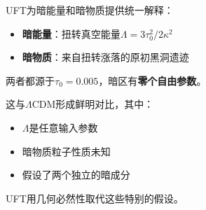 \begin{insight}[来自几何的暗区]
UFT为暗能量和暗物质提供统一解释：
\begin{itemize}
    \item \textbf{暗能量}：扭转真空能量$\Lambda = 3\tau_0^2/2\kappa^2$
    \item \textbf{暗物质}：来自扭转涨落的原初黑洞遗迹
\end{itemize}
两者都源于$\tau_0 = 0.005$，暗区有\textbf{零个自由参数}。
\end{insight}

这与$\Lambda$CDM形成鲜明对比，其中：
\begin{itemize}
    \item $\Lambda$是任意输入参数
    \item 暗物质粒子性质未知
    \item 假设了两个独立的暗成分
\end{itemize}

UFT用几何必然性取代这些特别的假设。
